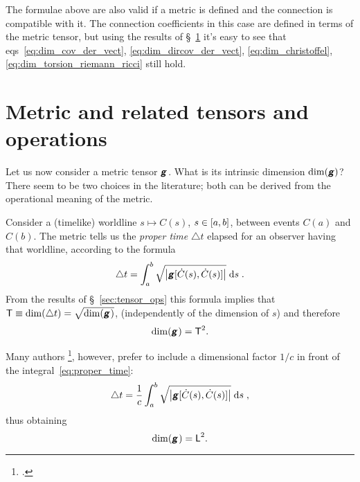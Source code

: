 \documentclass[a4paper,12pt,onecolumn,oneside,article,british]{memoir}
\makeatletter
\newcommand*{\mathte}[1]{\textbf{\textit{\textsf{#1}}}}
\newcommand*{\citep}{\footcites}
\newcommand*{\di}{\mathrm{d}}%
\newcommand*{\incr}{\triangle}%
\DeclarePairedDelimiter\clcl{[}{]}
\DeclarePairedDelimiter\abs{\lvert}{\rvert}
\newcommand*{\sect}{\S}%
\newcommand*{\chap}{ch.}%
\newcommand*{\eqn}{eq.}%
\newcommand*{\eqns}{eqs}%
\newcommand*{\eg}{{e.g.}}
\newcommand*{\q}{}%
\DeclareRobustCommand*{\q}{%
  \mathbin{\mathpalette\bigcdot@{}}%
}
\newcommand*{\bigcdot@scalefactor}{0.7}
\newcommand*{\bigcdot@widthfactor}{1.5}
\newcommand*{\bigcdot@}[2]{%
  \sbox0{$#1\vcenter{}$}%
  \sbox2{$#1\cdot\m@th$}%
  \hbox to \bigcdot@widthfactor\wd2{%
    \hfil
    \raise\ht0\hbox{%
      \scalebox{\bigcdot@scalefactor}{%
        \lower\ht0\hbox{$#1\bullet\m@th$}%
      }%
    }%
    \hfil
  }%
}
\newcommand*{\Le}{\textsf{L}}
\newcommand*{\Ti}{\textsf{T}}
\newcommand*{\yg}{\mathte{g}}
\newcommand*{\ygc}{\mathte{g}}
\renewcommand*{\i}{\indices}
\newcommand*{\inct}{\incr t}
\makeatother
\begin{document}
\medskip

The formulae above are also valid if a metric is defined and the connection
is compatible with it. The connection coefficients in this case are defined
in terms of the metric tensor, but using the results of
\sect~\ref{sec:metric} it's easy to see that
\eqns~\eqref{eq:dim_cov_der_vect}, \eqref{eq:dim_dircov_der_vect},
\eqref{eq:dim_christoffel}, \eqref{eq:dim_torsion_riemann_ricci} still
hold.


\section{Metric and related tensors and operations}
\label{sec:metric}

Let us now consider a metric tensor $\yg\i{_{\q\q}}$. What is its intrinsic
dimension $\dim(\yg)$? There seem to be two choices in the literature; both
can be derived from the operational meaning of the metric.


Consider a (timelike) worldline $s \mapsto C(s)$, $s\in \clcl{a,b}$,
between events $C(a)$ and $C(b)$. The metric tells us the \emph{proper
  time} $\inct$ elapsed for an observer having that worldline, according to
the formula
\begin{equation}%
  \label{eq:proper_time}
\inct =  \int_a^b
\sqrt{\abs*{\yg[\dot{C}(s),\dot{C}(s)]}} \; \di s\;.
\end{equation}
From the results of \sect~\ref{sec:tensor_ops} this formula implies that
 $\Ti \equiv \dim(\inct) = \sqrt{\dim(\yg\i{_{\q\q}})}$,
(independently of the dimension of $s$) and therefore
\begin{equation}%
    \label{eq:dim_g}
    \dim(\yg\i{_{\q\q}}) = \Ti^{2}.
  \end{equation}

  Many authors \citep[\eg][\sect~V.62
  \eqn~(62.02)]{fock1955_t1964}[\chap~11
  \eqn~(11.21)]{curtisetal1985}[\sect~5.3
  \eqn~(5.6)]{rindler1969_r1986}[\chap~6 \eqn~(6.24)]{hartle2003}, however,
  prefer to include a dimensional factor $1/c$ in front of the
  integral~\eqref{eq:proper_time}:
\begin{equation}%
  \label{eq:proper_time_c}
  \inct = \frac{1}{c} \int_a^b
  \sqrt{\abs*{\ygc[\dot{C}(s),\dot{C}(s)]}} \;\di s\;,
\end{equation}
thus obtaining
\begin{equation}%
  \label{eq:dim_g_c}
  \dim(\ygc\i{_{\q\q}}) = \Le^{2}.
\end{equation}
\end{document}
